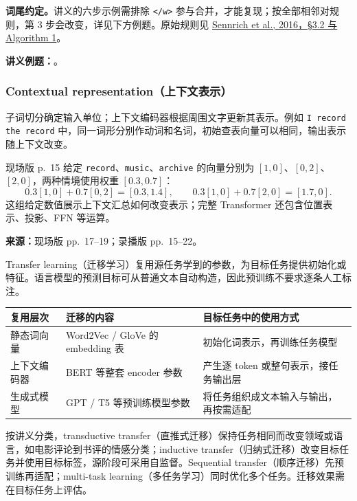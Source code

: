\textbf{词尾约定。}讲义的六步示例需排除 \texttt{</w>} 参与合并，才能复现；按全部相邻对规则，第 3 步会改变，详见下方例题。原始规则见 \href{https://aclanthology.org/P16-1162.pdf}{Sennrich et al., 2016，\S3.2 与 Algorithm 1}。

\textbf{讲义例题：}。

\subsubsection{Contextual representation（上下文表示）}

子词切分确定输入单位；上下文编码器根据周围文字更新其表示。例如 \texttt{I record the record} 中，同一词形分别作动词和名词，初始查表向量可以相同，输出表示随上下文改变。

现场版 p.~15 给定 \texttt{record}、\texttt{music}、\texttt{archive} 的向量分别为 $[1,0]$、$[0,2]$、$[2,0]$，两种情境使用权重 $[0.3,0.7]$：
\[
 0.3[1,0]+0.7[0,2]=[0.3,1.4],\qquad
 0.3[1,0]+0.7[2,0]=[1.7,0].
\]
这组给定数值展示上下文汇总如何改变表示；完整 Transformer 还包含位置表示、投影、FFN 等运算。

\nopagebreak[4]
\textbf{来源：}现场版 pp.~17--19；录播版 pp.~15--22。

Transfer learning（迁移学习）复用源任务学到的参数，为目标任务提供初始化或特征。语言模型的预测目标可从普通文本自动构造，因此预训练不要求逐条人工标注。

\begin{center}
\small
\begin{tabularx}{\textwidth}{@{}lXX@{}}
\toprule
复用层次 & 迁移的内容 & 目标任务中的使用方式 \\
\midrule
静态词向量 & Word2Vec / GloVe 的 embedding 表 & 初始化词表示，再训练任务模型 \\
上下文编码器 & BERT 等整套 encoder 参数 & 产生逐 token 或整句表示，接任务输出层 \\
生成式模型 & GPT / T5 等预训练模型参数 & 将任务组织成文本输入与输出，再按需适配 \\
\bottomrule
\end{tabularx}
\end{center}

按讲义分类，transductive transfer（直推式迁移）保持任务相同而改变领域或语言，如电影评论到书评的情感分类；inductive transfer（归纳式迁移）改变目标任务并使用目标标签，源阶段可采用自监督。Sequential transfer（顺序迁移）先预训练再适配；multi-task learning（多任务学习）同时优化多个任务。迁移效果需在目标任务上评估。

